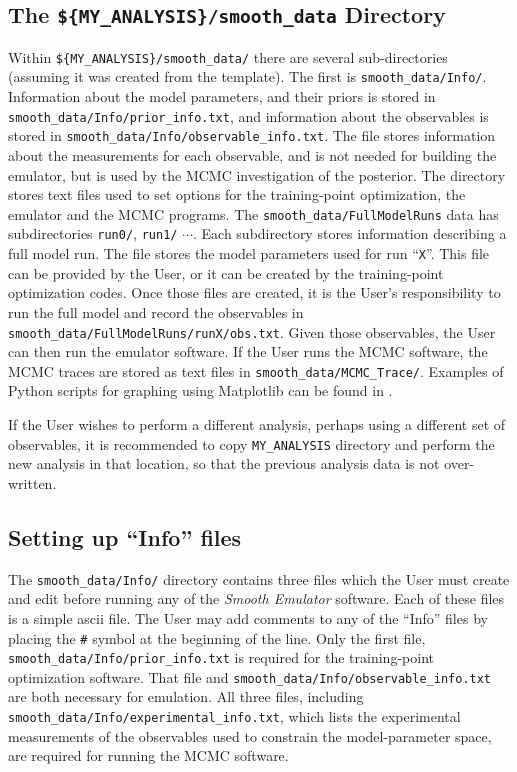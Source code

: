 \documentclass[UserManual.tex]{subfiles}
\begin{document}
\subsection{The {\tt \$\{MY\_ANALYSIS\}/smooth\_data} Directory}

Within {\tt \$\{MY\_ANALYSIS\}/smooth\_data/} there are several sub-directories (assuming it was created from the template). The first is {\tt smooth\_data/Info/}. Information about the model parameters, and their priors is stored in {\tt smooth\_data/Info/prior\_info.txt}, and information about the observables is stored in {\tt smooth\_data/Info/observable\_info.txt}. The file  stores information about the measurements for each observable, and is not needed for building the emulator, but is used by the MCMC investigation of the posterior. The  directory stores text files used to set options for the training-point optimization, the emulator and the MCMC programs. The {\tt smooth\_data/FullModelRuns} data has subdirectories {\tt run0/}, {\tt run1/} $\cdots$. Each subdirectory stores information describing a full model run. The file  stores the model parameters used for run ``{\tt X}''. This file can be provided by the User, or it can be created by the training-point optimization codes. Once those files are created, it is the User's responsibility to run the full model and record the observables in {\tt smooth\_data/FullModelRuns/runX/obs.txt}. Given those observables, the User can then run the emulator software. If the User runs the MCMC software, the MCMC traces are stored as text files in {\tt smooth\_data/MCMC\_Trace/}. Examples of Python scripts for graphing using Matplotlib can be found in .

If the User wishes to perform a different analysis, perhaps using a different set of observables, it is recommended to copy {\tt MY\_ANALYSIS} directory and perform the new analysis in that location, so that the previous analysis data is not over-written.

\subsection{Setting up ``Info'' files}
The {\tt smooth\_data/Info/} directory contains three files which the User must create and edit before running any of the {\it Smooth Emulator} software. Each of these files is a simple ascii file. The User may add comments to any of the ``Info'' files by placing the {\tt \#} symbol at the beginning of the line. Only the first file, {\tt smooth\_data/Info/prior\_info.txt} is required for the training-point optimization software. That file and {\tt smooth\_data/Info/observable\_info.txt} are both necessary for emulation. All three files, including {\tt smooth\_data/Info/experimental\_info.txt}, which lists the experimental measurements of the observables used to constrain the model-parameter space, are required for running the MCMC software.
\end{document}
